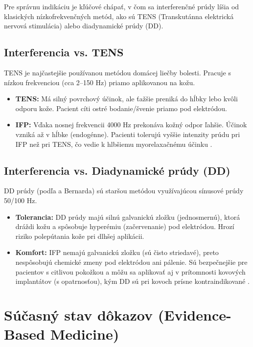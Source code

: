 Pre správnu indikáciu je kľúčové chápať, v čom sa interferenčné prúdy líšia od klasických nízkofrekvenčných metód, ako sú TENS (Transkutánna elektrická nervová stimulácia) alebo diadynamické prúdy (DD).

\subsection{Interferencia vs. TENS}

TENS je najčastejšie používanou metódou domácej liečby bolesti. Pracuje s nízkou frekvenciou (cca 2–150 Hz) priamo aplikovanou na kožu.

\begin{itemize}
    \item \textbf{TENS:} Má silný povrchový účinok, ale ťažšie preniká do hĺbky lebo kvôli odporu kože. Pacient cíti ostré bodanie/švenie priamo pod elektródou.
    \item \textbf{IFP:} Vďaka nosnej frekvencii 4000 Hz prekonáva kožný odpor ľahšie. Účinok vzniká až v hĺbke (endogénne). Pacienti tolerujú vyššie intenzity prúdu pri IFP než pri TENS, čo vedie k hlbšiemu myorelaxačnému účinku \parencite{Goats1990}.
\end{itemize}

\subsection{Interferencia vs. Diadynamické prúdy (DD)}

DD prúdy (podľa a Bernarda) sú staršou metódou využívajúcou sínusové prúdy 50/100 Hz.

\begin{itemize}
    \item \textbf{Tolerancia:} DD prúdy majú silnú galvanickú zložku (jednosmernú), ktorá dráždi kožu a spôsobuje hyperémiu (začervenanie) pod elektródou. Hrozí riziko polepútania kože pri dlhšej aplikácii.
    \item \textbf{Komfort:} IFP nemajú galvanickú zložku (sú čisto striedavé), preto nespôsobujú chemické zmeny pod elektródou ani pálenie. Sú bezpečnejšie pre pacientov s citlivou pokožkou a môžu sa aplikovať aj v prítomnosti kovových implantátov (s opatrnosťou), kým DD sú pri kovoch prísne kontraindikované \parencite{Podebradsky2009}.
\end{itemize}

\section{Súčasný stav dôkazov (Evidence-Based Medicine)}

